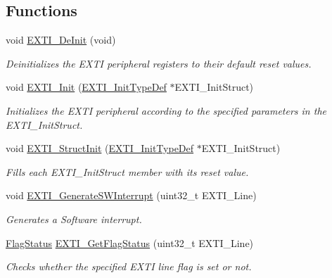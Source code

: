 \subsection*{Functions}
\begin{DoxyCompactItemize}
\item 
void \hyperlink{group___e_x_t_i___exported___functions_ga07072e339cb9ecb9cd9d4b94afc9f317}{E\+X\+T\+I\+\_\+\+De\+Init} (void)
\begin{DoxyCompactList}\small\item\em Deinitializes the E\+X\+TI peripheral registers to their default reset values. \end{DoxyCompactList}\item 
void \hyperlink{group___e_x_t_i___exported___functions_ga8c9ce6352a3a2dfc8fc9287cb24c6501}{E\+X\+T\+I\+\_\+\+Init} (\hyperlink{struct_e_x_t_i___init_type_def}{E\+X\+T\+I\+\_\+\+Init\+Type\+Def} $\ast$E\+X\+T\+I\+\_\+\+Init\+Struct)
\begin{DoxyCompactList}\small\item\em Initializes the E\+X\+TI peripheral according to the specified parameters in the E\+X\+T\+I\+\_\+\+Init\+Struct. \end{DoxyCompactList}\item 
void \hyperlink{group___e_x_t_i___exported___functions_ga86b9e662d18a2f829999cfb26aa7ca20}{E\+X\+T\+I\+\_\+\+Struct\+Init} (\hyperlink{struct_e_x_t_i___init_type_def}{E\+X\+T\+I\+\_\+\+Init\+Type\+Def} $\ast$E\+X\+T\+I\+\_\+\+Init\+Struct)
\begin{DoxyCompactList}\small\item\em Fills each E\+X\+T\+I\+\_\+\+Init\+Struct member with its reset value. \end{DoxyCompactList}\item 
void \hyperlink{group___e_x_t_i___exported___functions_ga897e8ea59f40a19e047fb9994876fc9b}{E\+X\+T\+I\+\_\+\+Generate\+S\+W\+Interrupt} (uint32\+\_\+t E\+X\+T\+I\+\_\+\+Line)
\begin{DoxyCompactList}\small\item\em Generates a Software interrupt. \end{DoxyCompactList}\item 
\hyperlink{group___exported__types_ga89136caac2e14c55151f527ac02daaff}{Flag\+Status} \hyperlink{group___e_x_t_i___exported___functions_ga0ce06e6b312592df149800d63218cffa}{E\+X\+T\+I\+\_\+\+Get\+Flag\+Status} (uint32\+\_\+t E\+X\+T\+I\+\_\+\+Line)
\begin{DoxyCompactList}\small\item\em Checks whether the specified E\+X\+TI line flag is set or not. \end{DoxyCompactList}\item 

\end{DoxyCompactItemize}
